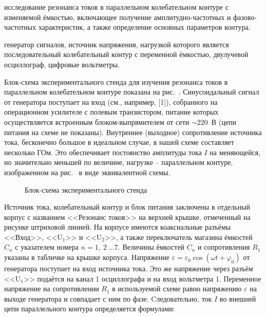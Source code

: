 
\begin{lab:aim}
	исследование резонанса токов в параллельном колебательном контуре с изменяемой ёмкостью, включающее получение амплитудно-частотных и фазово-частотных характеристик, а также определение основных параметров контура.
\end{lab:aim}

\begin{lab:equipment}
	генератор сигналов, источник напряжения, нагрузкой которого является последовательный колебательный контур с переменной ёмкостью, двулучевой осциллограф, цифровые вольтметры.
\end{lab:equipment}

\experiment
Блок-схема экспериментального стенда для изучения резонанса токов в параллельном колебательном контуре показана на рис.~. Синусоидальный сигнал от генератора поступает на вход  (см., например, [1]), собранного на операционном усилителе с полевым транзистором, питание которых осуществляется встроенным блоком-выпрямителем от сети $\sim220$~В (цепи питания на схеме не показаны).  Внутреннее (выходное) сопротивление источника тока, бесконечно большое в идеальном случае, в нашей схеме составляет несколько ГОм. Это обеспечивает постоянство амплитуды тока $I$ на меняющейся, но значительно меньшей по величине, нагрузке – параллельном контуре, изображенном на рис.~ в виде эквивалентной схемы.

\begin{figure}[h!]
	\caption{Блок-схема экспериментального стенда}
\end{figure}


Источник тока, колебательный контур и блок питания заключены в отдельный корпус с названием <<Резонанс токов>> на верхней крышке, отмеченный на рисунке штриховой линией. На корпусе имеются коаксиальные разъёмы <<Вход>>, <<$\text{U}_1$>> и <<$\text{U}_2$>>, а также переключатель магазина ёмкостей $C_n$ с указателем номера $n=1,~2~\ldots7.$ Величины ёмкостей $C_n$ и сопротивления $R_1$ указаны в табличке на крышке корпуса. Напряжение $\varepsilon=\varepsilon_0\cos(\omega t+\varphi_0)$ от генератора поступает на вход источника тока. Это же напряжение через разъём <<$\text{U}_1$>> подаётся на канал 1 осциллографа и на вход вольтметра 1. Переменное напряжение на сопротивлении $R_1$ в используемой схеме равно напряжению $\varepsilon$ на выходе генератора и совпадает с ним по фазе. Cледовательно, ток $I$ во внешней цепи параллельного контура определяется формулами:

